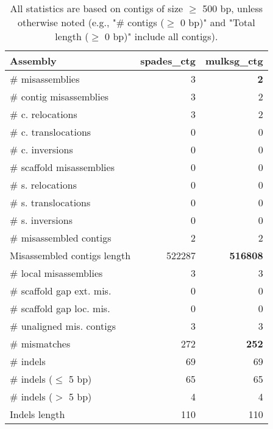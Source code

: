\documentclass[12pt,a4paper]{article}
\begin{document}
\begin{table}[ht]
\begin{center}
\caption{All statistics are based on contigs of size $\geq$ 500 bp, unless otherwise noted (e.g., "\# contigs ($\geq$ 0 bp)" and "Total length ($\geq$ 0 bp)" include all contigs).}
\begin{tabular}{|l*{2}{|r}|}
\hline
Assembly & spades\_ctg & mulksg\_ctg \\ \hline
\# misassemblies & 3 & {\bf 2} \\ \hline
\hspace{2mm}\# contig misassemblies & 3 & 2 \\ \hline
\hspace{5mm}\# c. relocations & 3 & 2 \\ \hline
\hspace{5mm}\# c. translocations & 0 & 0 \\ \hline
\hspace{5mm}\# c. inversions & 0 & 0 \\ \hline
\hspace{2mm}\# scaffold misassemblies & 0 & 0 \\ \hline
\hspace{5mm}\# s. relocations & 0 & 0 \\ \hline
\hspace{5mm}\# s. translocations & 0 & 0 \\ \hline
\hspace{5mm}\# s. inversions & 0 & 0 \\ \hline
\# misassembled contigs & 2 & 2 \\ \hline
Misassembled contigs length & 522287 & {\bf 516808} \\ \hline
\# local misassemblies & 3 & 3 \\ \hline
\# scaffold gap ext. mis. & 0 & 0 \\ \hline
\# scaffold gap loc. mis. & 0 & 0 \\ \hline
\# unaligned mis. contigs & 3 & 3 \\ \hline
\# mismatches & 272 & {\bf 252} \\ \hline
\# indels & 69 & 69 \\ \hline
\hspace{5mm}\# indels ($\leq$ 5 bp) & 65 & 65 \\ \hline
\hspace{5mm}\# indels ($>$ 5 bp) & 4 & 4 \\ \hline
Indels length & 110 & 110 \\ \hline
\end{tabular}
\end{center}
\end{table}
\end{document}
